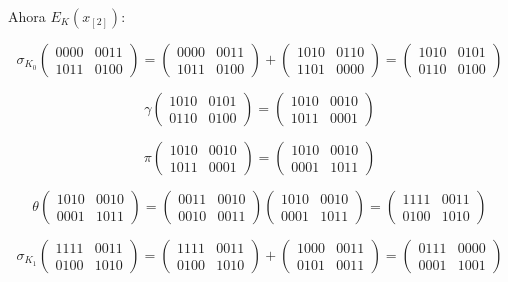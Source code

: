 \documentclass[a4paper]{article}
\begin{document}
Ahora $E_K(x_{[2]})$:

$$\sigma_{K_0} \begin{pmatrix} 0000 & 0011 \\ 1011 & 0100 \end{pmatrix} = \begin{pmatrix} 0000 & 0011 \\ 1011 & 0100 \end{pmatrix} + \begin{pmatrix} 1010 & 0110 \\ 1101 & 0000 \end{pmatrix} = \begin{pmatrix} 1010 & 0101 \\ 0110 & 0100 \end{pmatrix}$$

$$\gamma \begin{pmatrix} 1010 & 0101 \\ 0110 & 0100 \end{pmatrix} = \begin{pmatrix} 1010 & 0010 \\ 1011 & 0001 \end{pmatrix}$$

$$\pi \begin{pmatrix} 1010 & 0010 \\ 1011 & 0001 \end{pmatrix} = \begin{pmatrix} 1010 & 0010 \\ 0001 & 1011 \end{pmatrix}$$

$$\theta \begin{pmatrix} 1010 & 0010 \\ 0001 & 1011 \end{pmatrix} = \begin{pmatrix} 0011 & 0010 \\ 0010 & 0011 \end{pmatrix}\begin{pmatrix} 1010 & 0010 \\ 0001 & 1011 \end{pmatrix} = \begin{pmatrix} 1111 & 0011 \\ 0100 & 1010 \end{pmatrix}$$

$$\sigma_{K_1} \begin{pmatrix} 1111 & 0011 \\ 0100 & 1010 \end{pmatrix} = \begin{pmatrix} 1111 & 0011 \\ 0100 & 1010 \end{pmatrix} + \begin{pmatrix} 1000 & 0011 \\ 0101 & 0011 \end{pmatrix} = \begin{pmatrix} 0111 & 0000 \\ 0001 & 1001 \end{pmatrix}$$
\end{document}
